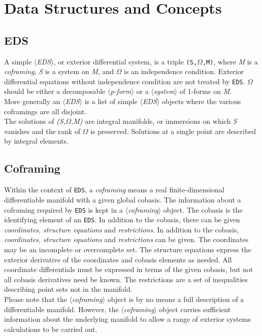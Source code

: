 \documentclass[11pt,letterpaper]{book}
\newcommand{\meta}[1]{\mbox{$\langle$\it#1\/$\rangle$}}
\begin{document}
\section{Data Structures and Concepts}
\subsection{EDS}
A simple \meta{EDS}, or exterior differential system, is a triple
{\tt (S,$\Omega$,M)}, where {\it M} is a {\it coframing}, {\it S} is a
system on {\it M}, and {\it $\Omega$} is an independence condition.
Exterior differential equations without independence condition are not
treated by {\tt EDS}. {\it $\Omega$} should be either a decomposable
\meta{p-form} or a \meta{system} of 1-forms on {\it M}. \\
More generally an \meta{EDS} is a list of simple \meta{EDS} objects
where the various coframings are all disjoint. \\
The solutions of {\it (S,$\Omega$,M)} are integral manifolds, or immersions
on which {\it S} vanishes and the rank of $\Omega$ is preserved. Solutions
at a single point are described by integral elements.

\subsection{Coframing}
Within the context of {\tt EDS}, a {\it coframing} means a real
finite-dimensional differentiable manifold with a given global cobasis.
The information about a coframing required by {\tt EDS} is kept in a
\meta{coframing} object. The cobasis is the identifying element of
an {\tt EDS}. In addition to the cobasis, there can be given {\it coordinates,
structure equations} and {\it restrictions}.
In addition to the cobasis, {\it coordinates, structure equations} and
{\it restrictions} can be given.
The coordinates may be an incomplete or
overcomplete set. The structure equations express the exterior derivative of the
coordinates and cobasis elements as needed. All coordinate differentials must
be expressed in terms of the given cobasis, but not all cobasis derivatives
need be known.
The restrictions are a set of inequalities describing point sets
not in the manifold. \\
Please note that the \meta{coframing} object is by no means a full description
of a differentiable manifold. However, the \meta{coframing} object carries
sufficient information about the underlying manifold to allow a range of exterior
systems calculations to be carried out.
\end{document}
